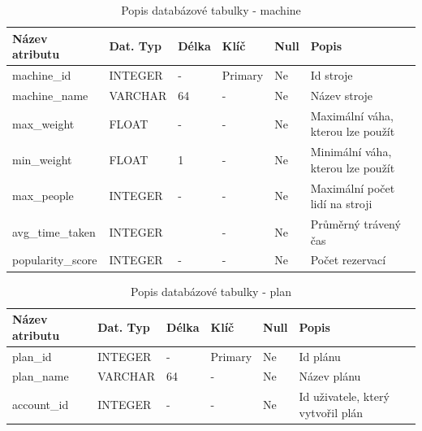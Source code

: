 \begin{table}[h!]
	\caption{Popis databázové tabulky - machine}
    \label{tab:dat-dictionary-machine}
	\begin{tabular}{|p{3.5cm}|p{2cm}|p{1cm}|p{2.5cm}|p{.75cm}|p{3.75cm}|}
		\hline
        \textbf{Název atributu} & \textbf{Dat. Typ} & \textbf{Délka} & \textbf{Klíč} & \textbf{Null} & \textbf{Popis} \\
        \hline
            machine\_id & INTEGER   &  -    & Primary       & Ne & Id stroje \\
            \hline
            machine\_name     & VARCHAR   &  64   & -                 & Ne & Název stroje \\
            \hline
            max\_weight       & FLOAT   &  -   & -                 & Ne &  Maximální váha, kterou lze použít \\
            \hline
            min\_weight       & FLOAT   &  1    & -                 & Ne &  Minimální váha, kterou lze použít \\
            \hline
            max\_people       & INTEGER   &  -  & -                 & Ne & Maximální počet lidí na stroji \\
            \hline
            avg\_time\_taken    & INTEGER   &     & -                 & Ne & Průměrný trávený čas \\
            \hline
            popularity\_score & INTEGER      &  -    & -                 & Ne &  Počet rezervací \\
        \hline
	\end{tabular}
\end{table}

\begin{table}[h!]
	\caption{Popis databázové tabulky - plan}
    \label{tab:dat-dictionary-plan}
	\begin{tabular}{|p{3.5cm}|p{2cm}|p{1cm}|p{2.5cm}|p{.75cm}|p{3.75cm}|}
		\hline
        \textbf{Název atributu} & \textbf{Dat. Typ} & \textbf{Délka} & \textbf{Klíč} & \textbf{Null} & \textbf{Popis} \\
        \hline
            plan\_id & INTEGER   &  -    & Primary       & Ne & Id plánu \\
        \hline
            plan\_name     & VARCHAR   &  64   & -                 & Ne & Název plánu \\
        \hline
            account\_id     & INTEGER   &  -   & -                 & Ne & Id uživatele, který vytvořil plán \\
        \hline
	\end{tabular}
\end{table}

